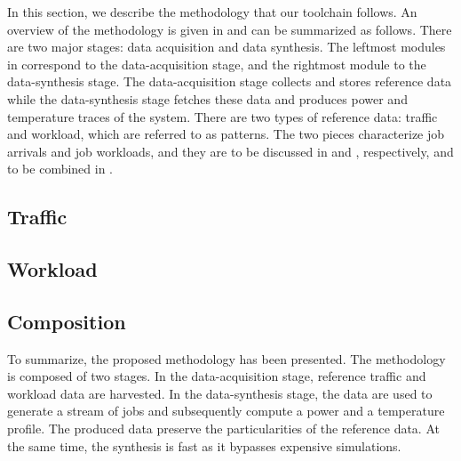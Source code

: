 In this section, we describe the methodology that our toolchain follows. An
overview of the methodology is given in  and can be summarized
as follows. There are two major stages: data acquisition and data synthesis. The
leftmost modules in  correspond to the data-acquisition stage,
and the rightmost module to the data-synthesis stage. The data-acquisition stage
collects and stores reference data while the data-synthesis stage fetches these
data and produces power and temperature traces of the system. There are two
types of reference data: traffic and workload, which are referred to as
patterns. The two pieces characterize job arrivals and job workloads, and they
are to be discussed in  and , respectively, and to
be combined in .

\subsection{Traffic} 


\subsection{Workload} 


\subsection{Composition} 


To summarize, the proposed methodology has been presented. The methodology is
composed of two stages. In the data-acquisition stage, reference traffic and
workload data are harvested. In the data-synthesis stage, the data are used to
generate a stream of jobs and subsequently compute a power and a temperature
profile. The produced data preserve the particularities of the reference data.
At the same time, the synthesis is fast as it bypasses expensive simulations.
